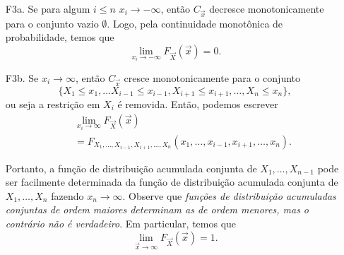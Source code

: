 \begin{frame}
\begin{block}{}
\begin{enumerate}
\item[F3a.] Se para algum $i\leq n$ $x_i\rightarrow -\infty$, então $C_{\vec{x}}$ decresce monotonicamente para o conjunto vazio $\emptyset$. Logo, pela continuidade monotônica de probabilidade, temos que
$$\lim_{x_i\rightarrow -\infty}F_{\vec{X}}(\vec{x})=0.$$


\item[F3b.] Se $x_i\rightarrow \infty$, então $C_{\vec{x}}$ cresce monotonicamente para o conjunto $$\{X_1\leq x_1,\ldots X_{i-1}\leq x_{i-1},X_{i+1}\leq x_{i+1},\ldots,X_n\leq x_n\},$$ ou seja a restrição em $X_i$ é removida. Então, podemos escrever
\begin{eqnarray}
& & \lim_{x_i\rightarrow \infty}F_{\vec{X}}(\vec{x})\nonumber \\
& & =F_{X_1,\ldots,X_{i-1},X_{i+1},\ldots,X_n}(x_1,\ldots,x_{i-1},x_{i+1},\ldots,x_n).\nonumber
\end{eqnarray}


Portanto, a função de distribuição acumulada conjunta de $X_1,\ldots,
X_{n-1}$ pode ser facilmente determinada da função de distribuição
acumulada conjunta de $X_1,\ldots,X_n$ fazendo
$x_n\rightarrow\infty$. Observe que {\em funções de distribuição
acumuladas conjuntas de ordem maiores determinam as de ordem
menores, mas o contrário não é verdadeiro}. Em particular, temos que
$$\lim_{\vec{x}\rightarrow\infty}F_{\vec{X}}(\vec{x})=1.$$

\end{enumerate}

\end{block}
\end{frame}

